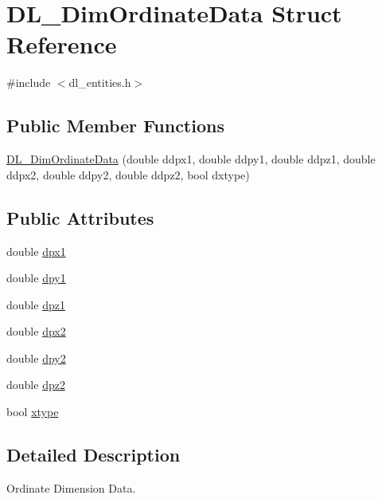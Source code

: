 \hypertarget{structDL__DimOrdinateData}{\section{D\-L\-\_\-\-Dim\-Ordinate\-Data Struct Reference}
\label{structDL__DimOrdinateData}
}


{\ttfamily \#include $<$dl\-\_\-entities.\-h$>$}

\subsection*{Public Member Functions}
\begin{DoxyCompactItemize}
\item 
\hyperlink{structDL__DimOrdinateData_a4ad5c91d57a6e195336970f1daf790a5}{D\-L\-\_\-\-Dim\-Ordinate\-Data} (double ddpx1, double ddpy1, double ddpz1, double ddpx2, double ddpy2, double ddpz2, bool dxtype)
\end{DoxyCompactItemize}
\subsection*{Public Attributes}
\begin{DoxyCompactItemize}
\item 
double \hyperlink{structDL__DimOrdinateData_aef8694a6d321e7f6a01134b3c5b36b02}{dpx1}
\item 
double \hyperlink{structDL__DimOrdinateData_a6f8c41156a98f323634f3867e927a4b2}{dpy1}
\item 
double \hyperlink{structDL__DimOrdinateData_a7a17ae1d34b60fe28d4343da393fa64d}{dpz1}
\item 
double \hyperlink{structDL__DimOrdinateData_a3dd62fba09e5d66433cad731fbf485ec}{dpx2}
\item 
double \hyperlink{structDL__DimOrdinateData_a2d792c23338fd746608c319f1b90967c}{dpy2}
\item 
double \hyperlink{structDL__DimOrdinateData_a0608b8a7deab75151d45f39ff4e18066}{dpz2}
\item 
bool \hyperlink{structDL__DimOrdinateData_afbc3cfb6eaf977407ab56698381e40b9}{xtype}
\end{DoxyCompactItemize}


\subsection{Detailed Description}
Ordinate Dimension Data.

